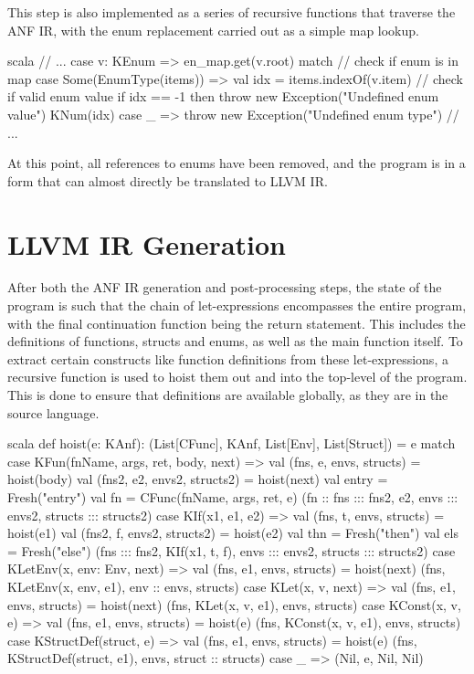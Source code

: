 This step is also implemented as a series of recursive functions that traverse the ANF IR, with the
enum replacement carried out as a simple map lookup.

\begin{code}{scala}
    // ...
    case v: KEnum =>
        en_map.get(v.root) match {
            // check if enum is in map
            case Some(EnumType(items)) =>
                val idx = items.indexOf(v.item)
                // check if valid enum value
                if idx == -1 then
                    throw new Exception("Undefined enum value")
                KNum(idx)
            case _ => throw new Exception("Undefined enum type")
        }
    // ...
\end{code}

At this point, all references to enums have been removed, and the program is in a form that can
almost directly be translated to LLVM IR.

\section{LLVM IR Generation}

After both the ANF IR generation and post-processing steps, the state of the program is such that
the chain of let-expressions encompasses the entire program, with the final continuation function
being the return statement. This includes the definitions of functions, structs and enums, as well
as the main function itself. To extract certain constructs like function definitions from these
let-expressions, a recursive function is used to hoist them out and into the top-level of the
program. This is done to ensure that definitions are available globally, as they are in the source
language.

\begin{code}{scala}
    def hoist(e: KAnf): (List[CFunc], KAnf, List[Env], List[Struct]) = e match {
        case KFun(fnName, args, ret, body, next) => {
            val (fns, e, envs, structs) = hoist(body)
            val (fns2, e2, envs2, structs2) = hoist(next)
            val entry = Fresh("entry")
            val fn = CFunc(fnName, args, ret, e)
            (fn :: fns ::: fns2, e2, envs ::: envs2, structs ::: structs2)
        }
        case KIf(x1, e1, e2) => {
            val (fns, t, envs, structs) = hoist(e1)
            val (fns2, f, envs2, structs2) = hoist(e2)
            val thn = Fresh("then")
            val els = Fresh("else")
            (fns ::: fns2, KIf(x1, t, f), envs ::: envs2, structs ::: structs2)
        }
        case KLetEnv(x, env: Env, next) => {
            val (fns, e1, envs, structs) = hoist(next)
            (fns, KLetEnv(x, env, e1), env :: envs, structs)
        }
        case KLet(x, v, next) => {
            val (fns, e1, envs, structs) = hoist(next)
            (fns, KLet(x, v, e1), envs, structs)
        }
        case KConst(x, v, e) => {
            val (fns, e1, envs, structs) = hoist(e)
            (fns, KConst(x, v, e1), envs, structs)
        }
        case KStructDef(struct, e) => {
            val (fns, e1, envs, structs) = hoist(e)
            (fns, KStructDef(struct, e1), envs, struct :: structs)
        }
        case _ => (Nil, e, Nil, Nil)
    }
\end{code}

